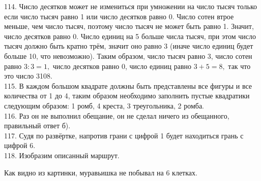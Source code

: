 \documentclass[12pt]{article}
\begin{document}
114. Число десятков может не измениться при умножении на число тысяч только если число тысяч равно 1 или число десятков равно 0. Число сотен втрое меньше, чем число тысяч, поэтому число тысяч не может быть равно 1. Значит, число десятков равно 0. Число единиц на 5 больше числа тысяч, при этом число тысяч должно быть кратно трём, значит оно равно 3 (иначе число единиц будет больше 10, что невозможно). Таким образом, число тысяч равно 3, число сотен равно $3:3=1,$ число десятков равно 0, число единиц равно $3+5=8,$ так что это число 3108.\\
115. В каждом большом квадрате должны быть представлены все фигуры и все количества от 1 до 4, таким образом необходимо заполнить пустые квадратики следующим образом: 1 ромб, 4 креста, 3 треугольника, 2 ромба.\\
116. Раз он не выполнил обещание, он не сделал ничего из обещанного, правильный ответ б).\\
117. Судя по развёртке, напротив грани с цифрой 1 будет находиться грань с цифрой 6.\\
118. Изобразим описанный маршрут.
\begin{center}
\begin{figure}[ht!]
\end{figure}
\end{center}
Как видно из картинки, муравьишка не побывал на 6 клетках.\\
\end{document}
